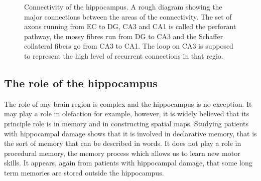 \documentclass[11pt,a4paper]{scrartcl}
\begin{document}
\begin{figure}
\caption{Connectivity of the hippocampus. A rough diagram showing the
  major connections between the areas of the connectivity. The set of
  axons running from EC to DG, CA3 and CA1 is called the perforant
  pathway, the mossy fibres run from DG to CA3 and the Schaffer
  collateral fibers go from CA3 to CA1. The loop on CA3 is supposed to
  represent the high level of recurrent connections in that
  regio.\label{fig:connectivity}}
\end{figure}

\subsection*{The role of the hippocampus}
The role of any brain region is complex and the hippocampus is no
exception. It may play a role in olefaction for example, however, it
is widely believed that its principle role is in memory and in
constructing spatial maps. Studying patients with hippocampal damage
shows that it is involved in declarative memory, that is the sort of
memory that can be described in words. It does not play a role in
procedural memory, the memory process which allows us to learn new
motor skills. It appears, again from patients with hippocampal damage,
that some long term memories are stored outside the hippocampus.
\end{document}
